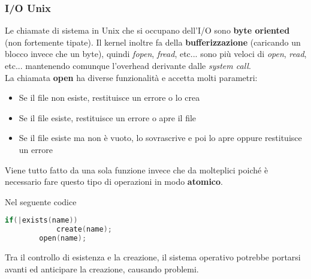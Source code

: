 \subsubsection{I/O Unix}
Le chiamate di sistema in Unix che si occupano dell'I/O sono \textbf{byte oriented} (non fortemente tipate). Il kernel inoltre fa della \textbf{bufferizzazione} (caricando un blocco invece che un byte), quindi \emph{fopen}, \emph{fread}, etc... sono più veloci di \emph{open}, \emph{read}, etc... mantenendo comunque l'overhead derivante dalle \emph{system call}.\\
La chiamata \textbf{open} ha diverse funzionalità e accetta molti parametri:
\begin{itemize}
	\item Se il file non esiste, restituisce un errore o lo crea
	\item Se il file esiste, restituisce un errore o apre il file
	\item Se il file esiste ma non è vuoto, lo sovrascrive e poi lo apre oppure restituisce un errore
\end{itemize}
Viene tutto fatto da una sola funzione invece che da molteplici poiché è necessario fare questo tipo di operazioni in modo \textbf{atomico}.
\begin{example}
	Nel seguente codice
	\begin{lstlisting}[language=C]
		if(|exists(name))
			create(name);
		open(name);
	\end{lstlisting}
	Tra il controllo di esistenza e la creazione, il sistema operativo potrebbe portarsi avanti ed anticipare la creazione, causando problemi.
\end{example}
